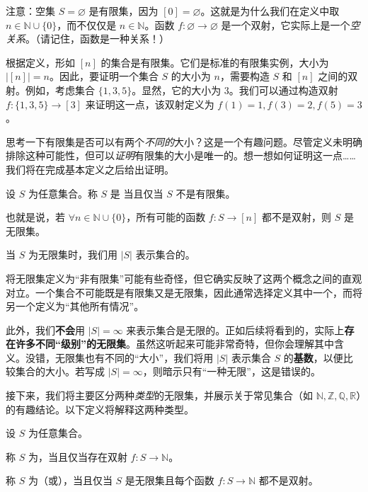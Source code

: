 注意：空集 $S = \varnothing$ 是有限集，因为 $[0] = \varnothing$。这就是为什么我们在定义中取 $n \in \mathbb{N} \cup \{0\}$，而不仅仅是 $n \in \mathbb{N}$。函数 $f : \varnothing \to \varnothing$ 是一个双射，它实际上是一个\emph{空关系}。（请记住，函数是一种关系！）

根据定义，形如 $[n]$ 的集合是有限集。它们是标准的有限集实例，大小为 $|[n]| = n$。因此，要证明一个集合 $S$ 的大小为 $n$，需要构造 $S$ 和 $[n]$ 之间的双射。例如，考虑集合 $\{1, 3, 5\}$。显然，它的大小为 $3$。我们可以通过构造双射 $f : \{1, 3, 5\} \to [3]$ 来证明这一点，该双射定义为 $f(1) = 1, f(3) = 2, f(5) = 3$。

思考一下有限集是否可以有两个\emph{不同的}大小？这是一个有趣问题。尽管定义未明确排除这种可能性，但可以\emph{证明}有限集的大小是唯一的。想一想如何证明这一点……我们将在完成基本定义之后给出证明。

\begin{definition}
    设 $S$ 为任意集合。称 $S$ 是 当且仅当 $S$ 不是有限集。

    也就是说，若 $\forall n \in \mathbb{N} \cup \{0\}$，所有可能的函数 $f : S \to [n]$ 都不是双射，则 $S$ 是无限集。

    当 $S$ 为无限集时，我们用 $|S|$ 表示集合的。
\end{definition}

将无限集定义为``非有限集''可能有些奇怪，但它确实反映了这两个概念之间的直观对立。一个集合不可能既是有限集又是无限集，因此通常选择定义其中一个，而将另一个定义为``其他所有情况''。

此外，我们\textbf{不会}用 $|S| = \infty$ 来表示集合是无限的。正如后续将看到的，实际上\textbf{存在许多不同``级别''的无限集}。虽然这听起来可能非常奇特，但你会理解其中含义。没错，无限集也有不同的``大小''，我们将用 $|S|$ 表示集合 $S$ 的\textbf{基数}，以便比较集合的大小。若写成 $|S| = \infty$，则暗示只有``一种无限''，这是错误的。

接下来，我们将主要区分两种\emph{类型}的无限集，并展示关于常见集合（如 $\mathbb{N}, \mathbb{Z}, \mathbb{Q}, \mathbb{R}$）的有趣结论。以下定义将解释这两种类型。

\begin{definition}
    设 $S$ 为任意集合。

    称 $S$ 为，当且仅当存在双射 $f : S \to \mathbb{N}$。

    称 $S$ 为（或），当且仅当 $S$ 是无限集且每个函数 $f : S \to \mathbb{N}$ 都不是双射。
\end{definition}


